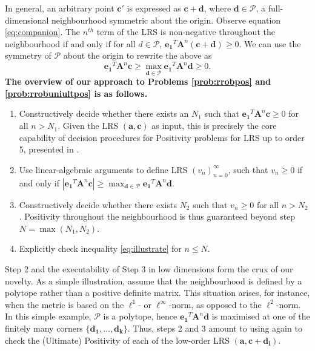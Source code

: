 In general, an arbitrary point $\mathbf{c'}$ is expressed as $\mathbf{c} + \mathbf{d}$, where $\mathbf{d} \in \mathcal{P}$, a full-dimensional neighbourhood symmetric about the origin. Observe equation \ref{eq:companion}. The $n^{th}$ term of the LRS is non-negative throughout the neighbourhood if and only if for all $d \in \mathcal{P}$,
$
\mathbf{e_1}^T \mathbf{A}^n (\mathbf{c + d}) \ge 0.
$
We can use the symmetry of $\mathcal{P}$ about the origin to rewrite the above as
\begin{equation}
\label{eq:illustrate}
\mathbf{e_1}^T \mathbf{A}^n \mathbf{c}\ge \max_{\mathbf{d} \in \mathcal{P}} \mathbf{e_1}^T\mathbf{A}^n\mathbf{d} \ge 0.
\end{equation}
\textbf{The overview of our approach to Problems \ref{prob:rrobpos} and \ref{prob:rrobuniultpos} is as follows.}
\begin{enumerate}
\item Constructively decide whether there exists an $N_1$ such that $\mathbf{e_1}^T \mathbf{A}^n \mathbf{c} \ge 0$ for all $n > N_1$. Given the LRS $(\mathbf{a}, \mathbf{c})$ as input, this is precisely the core capability of decision procedures for Positivity problems for LRS up to order 5, presented in \cite{joeljames3}.
\item Use linear-algebraic arguments to define LRS $(v_n)_{n=0}^\infty$, such that $v_n \ge 0$ if and only if $|\mathbf{e_1}^T \mathbf{A}^n \mathbf{c}|\ge \max_{\mathbf{d} \in \mathcal{P}} \mathbf{e_1}^T\mathbf{A}^n\mathbf{d}$.
\item Constructively decide whether there exists $N_2$ such that $v_n \ge 0$ for all $n > N_2$. Positivity throughout the neighbourhood is thus guaranteed beyond step $N = \max(N_1, N_2)$.
\item Explicitly check inequality \ref{eq:illustrate} for $n \le N$.
\end{enumerate}

Step 2 and the executability of Step 3 in low dimensions form the crux of our novelty. As a simple illustration, assume that the neighbourhood is defined by a polytope rather than a positive definite matrix. This situation arises, for instance, when the metric is based on the $\ell^1$- or $\ell^\infty$-norm, as opposed to the $\ell^2$-norm.  In this simple example, $\mathcal{P}$ is a polytope, hence $\mathbf{e_1}^T\mathbf{A}^n\mathbf{d}$ is maximised at one of the finitely many corners $\{\mathbf{d_1}, \dots, \mathbf{d_k}\}$. Thus, steps 2 and 3 amount to using \cite{joeljames3} again to check the (Ultimate) Positivity of each of the low-order LRS $(\mathbf{a}, \mathbf{c+d_i})$.

